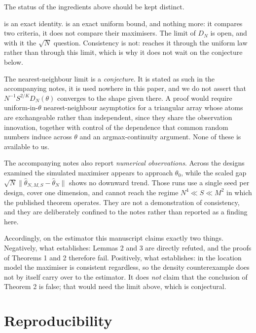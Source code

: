 \documentclass[11pt]{article}
\theoremstyle{definition}
\newcommand{\thetao}{\theta_0}
\begin{document}
The status of the ingredients above should be kept distinct.

 is an exact identity.  is an exact uniform bound, and nothing more: it compares two criteria, it does not compare their maximisers. The limit of $D_N$ is open, and with it the $\sqrt N$ question. Consistency is not:  reaches it through the uniform law  rather than through this limit, which is why it does not wait on the conjecture below.

The nearest-neighbour limit is a \emph{conjecture}. It is stated as such in the accompanying notes, it is used nowhere in this paper, and we do not assert that $N^{-1}S^{2/K}D_N(\theta)$ converges to the shape given there. A proof would require uniform-in-$\theta$ nearest-neighbour asymptotics for a triangular array whose atoms are exchangeable rather than independent, since they share the observation innovation, together with control of the dependence that common random numbers induce across $\theta$ and an argmax-continuity argument. None of these is available to us.

The accompanying notes also report \emph{numerical observations}. Across the designs examined the simulated maximiser appears to approach $\thetao$, while the scaled gap $\sqrt N\lVert\widehat\theta_{N,M,S}-\widehat\theta_N\rVert$ shows no downward trend. Those runs use a single seed per design, cover one dimension, and cannot reach the regime $N^4\ll S\ll M^2$ in which the published theorem operates. They are not a demonstration of consistency, and they are deliberately confined to the notes rather than reported as a finding here.

Accordingly, on the estimator this manuscript claims exactly two things. Negatively, what  establishes: Lemmas 2 and 3 are directly refuted, and the proofs of Theorems 1 and 2 therefore fail. Positively, what  establishes: in the location model the maximiser is consistent regardless, so the density counterexample does not by itself carry over to the estimator. It does \emph{not} claim that the conclusion of Theorem 2 is false; that would need the limit above, which is conjectural.

\FloatBarrier
\section{Reproducibility}\label{app:repro}
\end{document}
